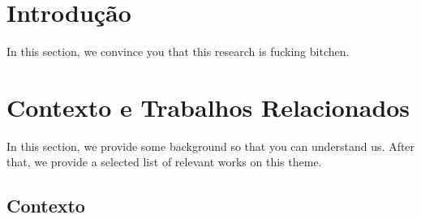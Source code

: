 \documentclass[sigconf]{acmart}
\begin{document}




\maketitle






\section{Introdução}

In this section, we convince you that this research is fucking bitchen.











\section{Contexto e Trabalhos Relacionados}

In this section, we provide some background so that you can understand us. After that, we provide a selected list of relevant works on this theme.





\subsection{Contexto}
\end{document}
